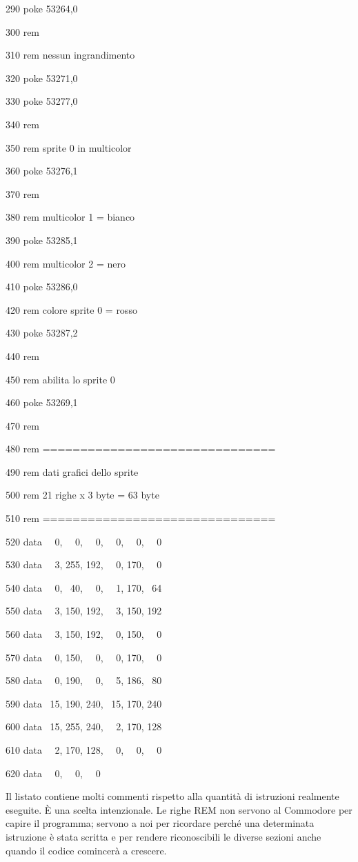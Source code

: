 \documentclass{article}
\begin{document}
290 poke 53264,0

300 rem

310 rem nessun ingrandimento

320 poke 53271,0

330 poke 53277,0

340 rem

350 rem sprite 0 in multicolor

360 poke 53276,1

370 rem

380 rem multicolor 1 = bianco

390 poke 53285,1

400 rem multicolor 2 = nero

410 poke 53286,0

420 rem colore sprite 0 = rosso

430 poke 53287,2

440 rem

450 rem abilita lo sprite 0

460 poke 53269,1

470 rem

480 rem ===============================

490 rem dati grafici dello sprite

500 rem 21 righe x 3 byte = 63 byte

510 rem ===============================

520 data \ \ 0, \ \ 0, \ \ 0, \ \ 0, \ \ 0, \ \ 0

530 data \ \ 3, 255, 192, \ \ 0, 170, \ \ 0

540 data \ \ 0, \ 40, \ \ 0, \ \ 1, 170, \ 64

550 data \ \ 3, 150, 192, \ \ 3, 150, 192

560 data \ \ 3, 150, 192, \ \ 0, 150, \ \ 0

570 data \ \ 0, 150, \ \ 0, \ \ 0, 170, \ \ 0

580 data \ \ 0, 190, \ \ 0, \ \ 5, 186, \ 80

590 data \ 15, 190, 240, \ 15, 170, 240

600 data \ 15, 255, 240, \ \ 2, 170, 128

610 data \ \ 2, 170, 128, \ \ 0, \ \ 0, \ \ 0

620 data \ \ 0, \ \ 0, \ \ 0

Il listato contiene molti commenti rispetto alla quantità di istruzioni realmente eseguite. È una scelta intenzionale.
Le righe REM non servono al Commodore per capire il programma; servono a noi per ricordare perché una determinata
istruzione è stata scritta e per rendere riconoscibili le diverse sezioni anche quando il codice comincerà a crescere.
\end{document}
